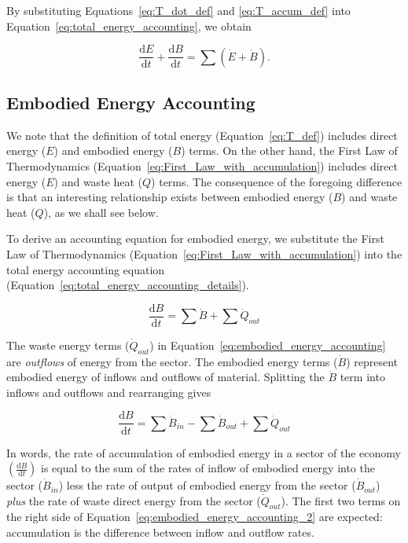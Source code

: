 By substituting Equations~\ref{eq:T_dot_def} and
\ref{eq:T_accum_def} into 
Equation~\ref{eq:total_energy_accounting},
we obtain

\begin{equation} \label{eq:total_energy_accounting_details}
	\frac{\mathrm{d}E}{\mathrm{d}t} 
	+ \frac{\mathrm{d}B}{\mathrm{d}t}
	= \sum{\left( \dot{E} 
			+ \dot{B} \right)}.
\end{equation}


\subsection{Embodied Energy Accounting}

We note that the definition of total energy 
(Equation~\ref{eq:T_def}) includes direct energy ($E$) 
and embodied energy ($B$) terms. 
On the other hand, the First Law of Thermodynamics 
(Equation~\ref{eq:First_Law_with_accumulation})
includes direct energy ($E$) and waste heat ($Q$) terms. 
The consequence of the foregoing difference is that 
an interesting relationship exists between embodied energy ($B$) 
and waste heat ($Q$), as we shall see below. 

To derive an accounting equation for embodied energy, we substitute the 
First Law of Thermodynamics (Equation~\ref{eq:First_Law_with_accumulation})
into the total energy accounting equation (Equation~\ref{eq:total_energy_accounting_details}).

\begin{equation} \label{eq:embodied_energy_accounting}
	\frac{\mathrm{d}B}{\mathrm{d}t}
	= \sum \dot{B} 
	+ \sum \dot{Q}_{out}
\end{equation}

The waste energy terms ($\dot{Q}_{out}$) 
in Equation~\ref{eq:embodied_energy_accounting}
are \emph{outflows} of energy from the sector. 
The embodied energy 
terms ($\dot{B}$) represent embodied energy of inflows
and outflows of material. Splitting the $\dot{B}$ term
into inflows and outflows and rearranging gives

\begin{equation} \label{eq:embodied_energy_accounting_2}
	\frac{\mathrm{d}B}{\mathrm{d}t}
	= \sum \dot{B}_{in}
	- \sum \dot{B}_{out} 
	+ \sum \dot{Q}_{out}
\end{equation}

In words, the rate of accumulation of embodied energy 
in a sector of the economy 
$\left( \frac{\mathrm{d}B}{\mathrm{d}t} \right)$ 
is equal to the sum of the rates of 
inflow of embodied energy into the sector 
	($\dot{B}_{in}$) 
less the rate of output of embodied energy from the sector 
	($\dot{B}_{out}$) 
\emph{plus} the rate of waste direct energy from the sector 
	($\dot{Q}_{out}$). 
The first two terms on the right side of
Equation~\ref{eq:embodied_energy_accounting_2} are expected: 
accumulation is the difference between inflow and outflow rates. 

